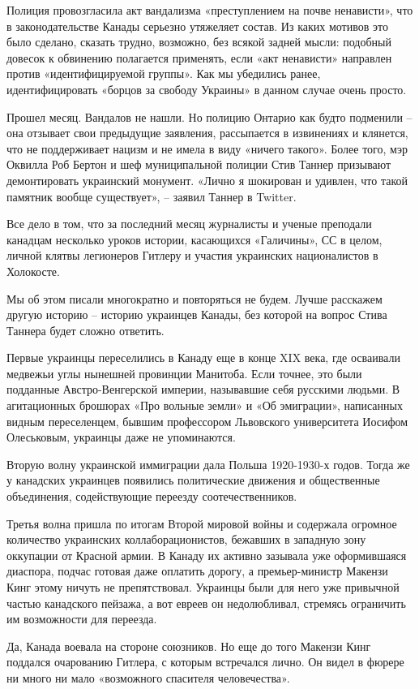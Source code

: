 Полиция провозгласила акт вандализма «преступлением на почве ненависти», что в
законодательстве Канады серьезно утяжеляет состав. Из каких мотивов это было
сделано, сказать трудно, возможно, без всякой задней мысли: подобный довесок к
обвинению полагается применять, если «акт ненависти» направлен против
«идентифицируемой группы». Как мы убедились ранее, идентифицировать «борцов за
свободу Украины» в данном случае очень просто.

Прошел месяц. Вандалов не нашли. Но полицию Онтарио как будто подменили – она
отзывает свои предыдущие заявления, рассыпается в извинениях и клянется, что не
поддерживает нацизм и не имела в виду «ничего такого». Более того, мэр Оквилла
Роб Бертон и шеф муниципальной полиции Стив Таннер призывают демонтировать
украинский монумент. «Лично я шокирован и удивлен, что такой памятник вообще
существует», – заявил Таннер в Twitter.

Все дело в том, что за последний месяц журналисты и ученые преподали канадцам
несколько уроков истории, касающихся «Галичины», СС в целом, личной клятвы
легионеров Гитлеру и участия украинских националистов в Холокосте.

Мы об этом писали многократно и повторяться не будем. Лучше расскажем другую
историю – историю украинцев Канады, без которой на вопрос Стива Таннера будет
сложно ответить.

Первые украинцы переселились в Канаду еще в конце XIX века, где осваивали
медвежьи углы нынешней провинции Манитоба. Если точнее, это были подданные
Австро-Венгерской империи, называвшие себя русскими людьми. В агитационных
брошюрах «Про вольные земли» и «Об эмиграции», написанных видным переселенцем,
бывшим профессором Львовского университета Иосифом Олеськовым, украинцы даже не
упоминаются.

Вторую волну украинской иммиграции дала Польша 1920-1930-х годов. Тогда же у
канадских украинцев появились политические движения и общественные объединения,
содействующие переезду соотечественников.

Третья волна пришла по итогам Второй мировой войны и содержала огромное
количество украинских коллаборационистов, бежавших в западную зону оккупации от
Красной армии. В Канаду их активно зазывала уже оформившаяся диаспора, подчас
готовая даже оплатить дорогу, а премьер-министр Макензи Кинг этому ничуть не
препятствовал. Украинцы были для него уже привычной частью канадского пейзажа,
а вот евреев он недолюбливал, стремясь ограничить им возможности для переезда.

Да, Канада воевала на стороне союзников. Но еще до того Макензи Кинг поддался
очарованию Гитлера, с которым встречался лично. Он видел в фюрере ни много ни
мало «возможного спасителя человечества».

